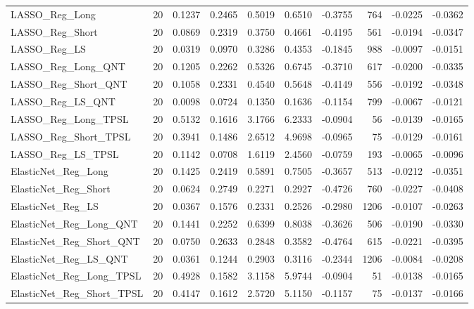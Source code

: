 \begin{tabular}{llrrrrrrrr}
\cline{1-10}
LASSO\_Reg\_Long & 20 & 0.1237 & 0.2465 & 0.5019 & 0.6510 & -0.3755 & 764 & -0.0225 & -0.0362 \\
\cline{1-10}
LASSO\_Reg\_Short & 20 & 0.0869 & 0.2319 & 0.3750 & 0.4661 & -0.4195 & 561 & -0.0194 & -0.0347 \\
\cline{1-10}
LASSO\_Reg\_LS & 20 & 0.0319 & 0.0970 & 0.3286 & 0.4353 & -0.1845 & 988 & -0.0097 & -0.0151 \\
\cline{1-10}
LASSO\_Reg\_Long\_QNT & 20 & 0.1205 & 0.2262 & 0.5326 & 0.6745 & -0.3710 & 617 & -0.0200 & -0.0335 \\
\cline{1-10}
LASSO\_Reg\_Short\_QNT & 20 & 0.1058 & 0.2331 & 0.4540 & 0.5648 & -0.4149 & 556 & -0.0192 & -0.0348 \\
\cline{1-10}
LASSO\_Reg\_LS\_QNT & 20 & 0.0098 & 0.0724 & 0.1350 & 0.1636 & -0.1154 & 799 & -0.0067 & -0.0121 \\
\cline{1-10}
LASSO\_Reg\_Long\_TPSL & 20 & 0.5132 & 0.1616 & 3.1766 & 6.2333 & -0.0904 & 56 & -0.0139 & -0.0165 \\
\cline{1-10}
LASSO\_Reg\_Short\_TPSL & 20 & 0.3941 & 0.1486 & 2.6512 & 4.9698 & -0.0965 & 75 & -0.0129 & -0.0161 \\
\cline{1-10}
LASSO\_Reg\_LS\_TPSL & 20 & 0.1142 & 0.0708 & 1.6119 & 2.4560 & -0.0759 & 193 & -0.0065 & -0.0096 \\
\cline{1-10}
ElasticNet\_Reg\_Long & 20 & 0.1425 & 0.2419 & 0.5891 & 0.7505 & -0.3657 & 513 & -0.0212 & -0.0351 \\
\cline{1-10}
ElasticNet\_Reg\_Short & 20 & 0.0624 & 0.2749 & 0.2271 & 0.2927 & -0.4726 & 760 & -0.0227 & -0.0408 \\
\cline{1-10}
ElasticNet\_Reg\_LS & 20 & 0.0367 & 0.1576 & 0.2331 & 0.2526 & -0.2980 & 1206 & -0.0107 & -0.0263 \\
\cline{1-10}
ElasticNet\_Reg\_Long\_QNT & 20 & 0.1441 & 0.2252 & 0.6399 & 0.8038 & -0.3626 & 506 & -0.0190 & -0.0330 \\
\cline{1-10}
ElasticNet\_Reg\_Short\_QNT & 20 & 0.0750 & 0.2633 & 0.2848 & 0.3582 & -0.4764 & 615 & -0.0221 & -0.0395 \\
\cline{1-10}
ElasticNet\_Reg\_LS\_QNT & 20 & 0.0361 & 0.1244 & 0.2903 & 0.3116 & -0.2344 & 1206 & -0.0084 & -0.0208 \\
\cline{1-10}
ElasticNet\_Reg\_Long\_TPSL & 20 & 0.4928 & 0.1582 & 3.1158 & 5.9744 & -0.0904 & 51 & -0.0138 & -0.0165 \\
\cline{1-10}
ElasticNet\_Reg\_Short\_TPSL & 20 & 0.4147 & 0.1612 & 2.5720 & 5.1150 & -0.1157 & 75 & -0.0137 & -0.0166 \\

\end{tabular}
